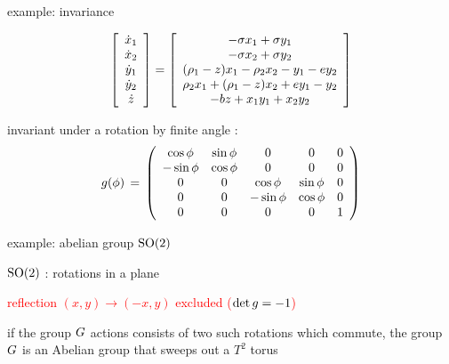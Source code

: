 \begin{frame}{example:  invariance}
			\begin{exampleblock}{{\cLe}}
\scriptsize		
\[
		\left[
					\begin{array}{c}
				\dot{x}_1 \\ \dot{x}_2 \\ \dot{y}_1 \\ \dot{y}_2 \\ \dot{z}
				\end{array}
		\right]
=
		\left[
					\begin{array}{c}
				 -\sigma x_1 + \sigma y_1 \\
				-\sigma x_2 + \sigma y_2 \\
                (\RerCLor-z) x_1 - \ImrCLor x_2 -y_1-e y_2 \\
                \ImrCLor x_1 + (\RerCLor-z) x_2 + e y_1- y_2 \\
				-b z + x_1 y_1 + x_2 y_2
				\end{array}
		\right]
\]
			\end{exampleblock}

\begin{block}{}
invariant under a  rotation by finite angle
\gSpace:
\scriptsize		
\[
\LieEl(\gSpace) \,=\,  \left(\barr{ccccc}
  \cos \gSpace  & \sin \gSpace  & 0 & 0 & 0 \\
 -\sin \gSpace  & \cos \gSpace  & 0 & 0 & 0 \\
 0 & 0 &  \cos \gSpace & \sin \gSpace   & 0 \\
 0 & 0 & -\sin \gSpace & \cos \gSpace   & 0 \\
 0 & 0 & 0             & 0              & 1
    \earr\right)
\] %
\end{block}
\end{frame}

\begin{frame}{example: abelian group $\SOn{2}$}

$\SOn{2}$ : rotations in a plane

\hfill \textcolor{red}{\scriptsize
reflection $(x,y) \to (-x,y)$ excluded ($\det \LieEl = -1$)
}

\bigskip\bigskip
if the group $\Group$ actions consists of two such rotations which
commute,
the group $\Group$ is an Abelian group that sweeps out a
$T^2$ torus
\end{frame}

